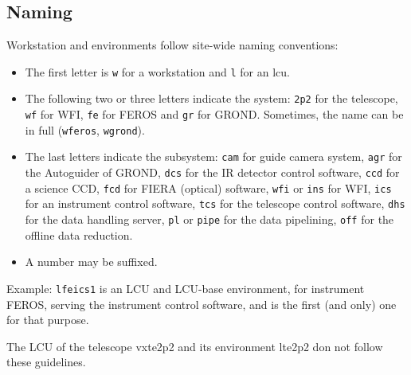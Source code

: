 \documentclass[11pt,fleqn,a4paper]{book}
\begin{document}
\subsection{Naming}
Workstation and environments follow site-wide naming conventions:
\begin{itemize}
    \item The first letter is \texttt{w} for a \gls{workstation} and \texttt{l} for an \gls{lcu}.
    \item The following two or three letters indicate the system: \texttt{2p2} for the telescope, \texttt{wf} for WFI, \texttt{fe} for FEROS and \texttt{gr} for GROND. Sometimes, the name can be in full (\texttt{wferos}, \texttt{wgrond}).
    \item The last letters indicate the subsystem: \texttt{cam} for guide camera system, \texttt{agr} for the Autoguider of GROND, \texttt{dcs} for the IR detector control software, \texttt{ccd} for a science CCD, \texttt{fcd} for FIERA (optical) software, \texttt{wfi} or \texttt{ins} for WFI, \texttt{ics} for an instrument control software, \texttt{tcs} for the telescope control software, \texttt{dhs} for the data handling server, \texttt{pl} or \texttt{pipe} for the data pipelining, \texttt{off} for the offline data reduction.
    \item A number may be suffixed.
\end{itemize}

Example: \texttt{lfeics1} is an LCU and LCU-base environment, for instrument FEROS, serving the instrument control software, and is the first (and only) one for that purpose. 

The LCU of the telescope \gls{vxte2p2} and its environment \gls{lte2p2} don not follow these guidelines.
\end{document}
